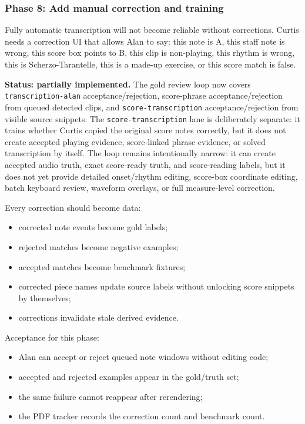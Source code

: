 \subsubsection*{Phase 8: Add manual correction and training}

Fully automatic transcription will not become reliable without corrections. Curtis needs a correction UI that allows Alan to say: this note is A, this staff note is wrong, this score box points to B, this clip is non-playing, this rhythm is wrong, this is Scherzo-Tarantelle, this is a made-up exercise, or this score match is false.

\textbf{Status: partially implemented.} The gold review loop now covers \texttt{transcription-alan} acceptance/rejection, score-phrase acceptance/rejection from queued detected clips, and \texttt{score-transcription} acceptance/rejection from visible source snippets. The \texttt{score-transcription} lane is deliberately separate: it trains whether Curtis copied the original score notes correctly, but it does not create accepted playing evidence, score-linked phrase evidence, or solved transcription by itself. The loop remains intentionally narrow: it can create accepted audio truth, exact score-ready truth, and score-reading labels, but it does not yet provide detailed onset/rhythm editing, score-box coordinate editing, batch keyboard review, waveform overlays, or full measure-level correction.

Every correction should become data:
\begin{itemize}
    \item corrected note events become gold labels;
    \item rejected matches become negative examples;
    \item accepted matches become benchmark fixtures;
    \item corrected piece names update source labels without unlocking score snippets by themselves;
    \item corrections invalidate stale derived evidence.
\end{itemize}

Acceptance for this phase:
\begin{itemize}
    \item Alan can accept or reject queued note windows without editing code;
    \item accepted and rejected examples appear in the gold/truth set;
    \item the same failure cannot reappear after rerendering;
    \item the PDF tracker records the correction count and benchmark count.
\end{itemize}

